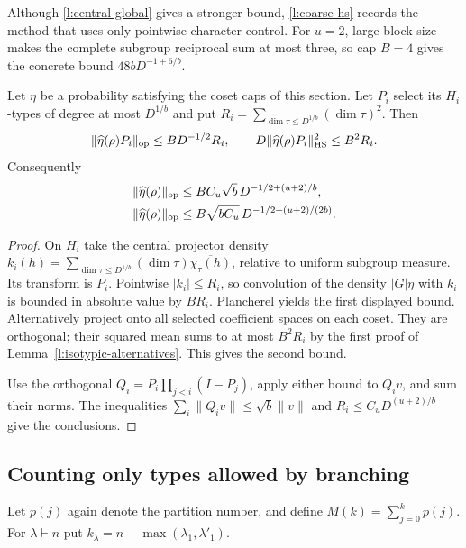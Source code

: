 Although \eqref{l:central-global} gives a stronger bound, \eqref{l:coarse-hs} records the method that uses only pointwise character control. For $u=2$, large block size makes the complete subgroup reciprocal sum at most three, so cap $B=4$ gives the concrete bound $48bD^{-1+6/b}$.

\begin{proposition}\label{l:central-projector-operator}
Let $\eta$ be a probability satisfying the coset caps of this section. Let $P_i$ select its $H_i$-types of degree at most $D^{1/b}$ and put $R_i=\sum_{\dim\tau\le D^{1/b}}(\dim\tau)^2$. Then
\[
 \|\widehat\eta(\rho)P_i\|_{\mathrm{op}}\le BD^{-1/2}R_i,
 \qquad D\|\widehat\eta(\rho)P_i\|_{\mathrm{HS}}^2\le B^2R_i.
\]
Consequently
\begin{align*}
 \|\widehat\eta(\rho)\|_{\mathrm{op}}&\le BC_u\sqrt b\,D^{-1/2+(u+2)/b},\\
 \|\widehat\eta(\rho)\|_{\mathrm{op}}&\le B\sqrt{bC_u}\,D^{-1/2+(u+2)/(2b)}.
\end{align*}
\end{proposition}
\begin{proof}
On $H_i$ take the central projector density $k_i(h)=\sum_{\dim\tau\le D^{1/b}}(\dim\tau)\overline{\chi_\tau(h)}$, relative to uniform subgroup measure. Its transform is $P_i$. Pointwise $|k_i|\le R_i$, so convolution of the density $|G|\eta$ with $k_i$ is bounded in absolute value by $BR_i$. Plancherel yields the first displayed bound. Alternatively project onto all selected coefficient spaces on each coset. They are orthogonal; their squared mean sums to at most $B^2R_i$ by the first proof of Lemma~\ref{l:isotypic-alternatives}. This gives the second bound.

Use the orthogonal $Q_i=P_i\prod_{j<i}(I-P_j)$, apply either bound to $Q_iv$, and sum their norms. The inequalities $\sum_i\|Q_iv\|\le\sqrt b\|v\|$ and $R_i\le C_uD^{(u+2)/b}$ give the conclusions.
\end{proof}

\subsection{Counting only types allowed by branching}

Let $p(j)$ again denote the partition number, and define $M(k)=\sum_{j=0}^kp(j)$. For $\lambda\vdash n$ put $k_\lambda=n-\max(\lambda_1,\lambda'_1)$.

